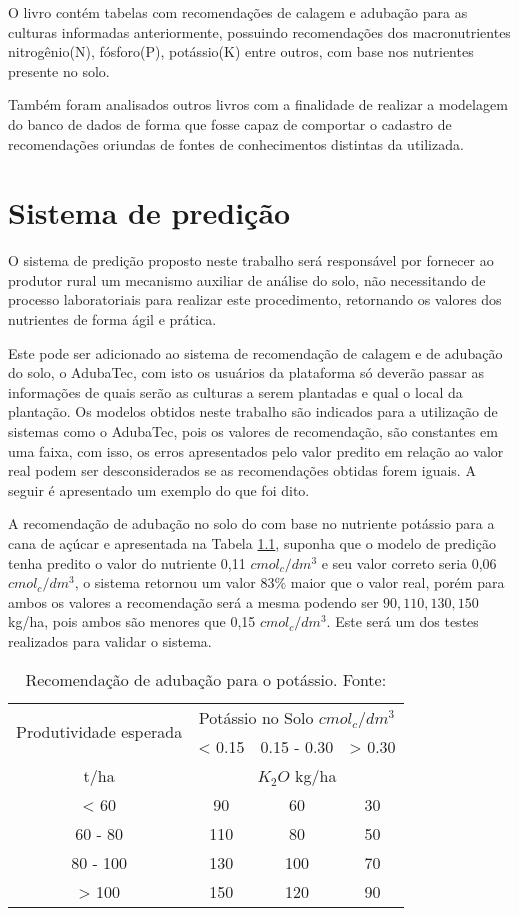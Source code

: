 \documentclass[
12pt,				%
oneside,			%
a4paper,			%
english,			%
french,				%
spanish,			%
brazil				%
]{abntex2}
\begin{document}
O livro contém tabelas com recomendações de calagem e adubação para as culturas informadas anteriormente, possuindo recomendações dos macronutrientes nitrogênio(N), fósforo(P), potássio(K) entre outros, com base nos nutrientes presente no solo. 

Também foram analisados outros livros com a finalidade de realizar a modelagem do banco de dados de forma que fosse capaz de comportar o cadastro de recomendações oriundas de fontes de conhecimentos distintas da utilizada.

\chapter{Sistema de predição}


O sistema de predição proposto neste trabalho será responsável por fornecer ao  produtor rural um mecanismo auxiliar de análise do solo, não necessitando de processo laboratoriais para realizar este procedimento, retornando os valores dos nutrientes de forma ágil e prática.

Este pode ser adicionado ao sistema de recomendação de calagem e de adubação do solo, o AdubaTec, com isto os usuários da plataforma só deverão passar as informações de quais serão as culturas a serem plantadas e qual o local da plantação. Os modelos obtidos neste trabalho são indicados para a utilização de sistemas como o AdubaTec, pois os valores de recomendação, são constantes em uma faixa, com isso, os erros apresentados pelo valor predito em relação ao valor real podem ser desconsiderados se as recomendações obtidas forem iguais. A seguir é apresentado um exemplo do que foi dito.

A recomendação de adubação no solo do com base no nutriente potássio para a cana de açúcar e apresentada na Tabela \ref{tab:recomendacaopotasso}, suponha que o modelo de predição tenha predito o valor do nutriente 0,11 $cmol_{c}/dm^3$ e seu valor correto seria 0,06 $cmol_{c}/dm^3$, o sistema retornou um valor $83\%$ maior que o valor real, porém para ambos os valores a recomendação será a mesma podendo ser $90,110,130,150$ kg/ha, pois ambos são menores que 0,15 $cmol_{c}/dm^3$. Este será um dos testes realizados para validar o sistema.   

\begin{table}[h]
	\centering
	\caption{Recomendação de adubação para o potássio. Fonte:\cite{b1996recomendaccoes}}
	\begin{tabular}{c|c|c|c}
	\multirow{2}{*}{Produtividade esperada } &\multicolumn{3}{c}{Potássio no Solo $cmol_{c}/dm^3$} \\
		 & < 0.15 & 0.15 - 0.30  & > 0.30 \\ \hline
		 t/ha & \multicolumn{3}{c}{$K_{2}O$ kg/ha}\\\hline
		 < 60 & 90  &  60  & 30 \\
		 60 - 80 & 110  & 80  & 50 \\
		 80 - 100 & 130  & 100  & 70 \\
		 > 100 & 150  & 120  & 90 \\
	\end{tabular}
	\label{tab:recomendacaopotasso}
\end{table}
  
\end{document}

